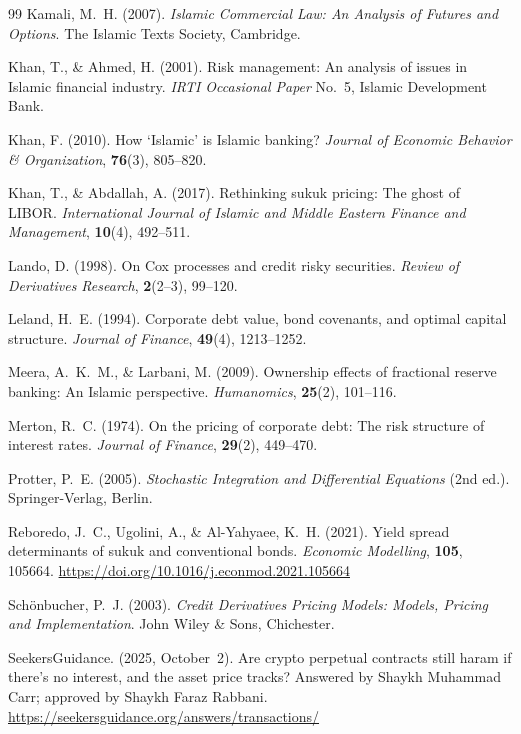 \documentclass[10pt,twocolumn]{article}
\theoremstyle{plain}
\theoremstyle{definition}
\begin{document}
\begin{thebibliography}{99}
Kamali, M.~H. (2007).
\textit{Islamic Commercial Law: An Analysis of Futures and Options}.
The Islamic Texts Society, Cambridge.

Khan, T., \& Ahmed, H. (2001).
Risk management: An analysis of issues in Islamic financial industry.
\textit{IRTI Occasional Paper} No.~5, Islamic Development Bank.

Khan, F. (2010).
How `Islamic' is Islamic banking?
\textit{Journal of Economic Behavior \& Organization},
\textbf{76}(3), 805--820.

Khan, T., \& Abdallah, A. (2017).
Rethinking sukuk pricing: The ghost of LIBOR.
\textit{International Journal of Islamic and Middle Eastern
Finance and Management}, \textbf{10}(4), 492--511.

Lando, D. (1998).
On Cox processes and credit risky securities.
\textit{Review of Derivatives Research}, \textbf{2}(2--3), 99--120.

Leland, H.~E. (1994).
Corporate debt value, bond covenants, and optimal capital structure.
\textit{Journal of Finance}, \textbf{49}(4), 1213--1252.

Meera, A.~K.~M., \& Larbani, M. (2009).
Ownership effects of fractional reserve banking: An Islamic
perspective.
\textit{Humanomics}, \textbf{25}(2), 101--116.

Merton, R.~C. (1974).
On the pricing of corporate debt: The risk structure of interest rates.
\textit{Journal of Finance}, \textbf{29}(2), 449--470.

Protter, P.~E. (2005).
\textit{Stochastic Integration and Differential Equations}
(2nd ed.).
Springer-Verlag, Berlin.

Reboredo, J.~C., Ugolini, A., \& Al-Yahyaee, K.~H. (2021).
Yield spread determinants of sukuk and conventional bonds.
\textit{Economic Modelling}, \textbf{105}, 105664.
\url{https://doi.org/10.1016/j.econmod.2021.105664}

Schönbucher, P.~J. (2003).
\textit{Credit Derivatives Pricing Models: Models, Pricing
and Implementation}.
John Wiley \& Sons, Chichester.

SeekersGuidance. (2025, October~2).
Are crypto perpetual contracts still haram if there's no interest,
and the asset price tracks? Answered by Shaykh Muhammad Carr;
approved by Shaykh Faraz Rabbani.
\url{https://seekersguidance.org/answers/transactions/}


\end{thebibliography}
\end{document}
